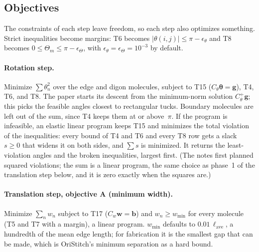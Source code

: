 \documentclass[11pt]{article}
\theoremstyle{definition}
\begin{document}
\subsection{Objectives}

The constraints of each step leave freedom, so each step also optimizes
something. Strict inequalities become margins: T6 becomes
$|\theta(i,j)| \le \pi - \epsilon_\theta$ and T8 becomes
$0 \le \Theta_m \le \pi - \epsilon_\Theta$, with
$\epsilon_\theta = \epsilon_\Theta = 10^{-3}$ by default.

\paragraph{Rotation step.} Minimize $\sum \theta_n^2$ over the edge and digon
molecules, subject to T15 ($C_\theta\boldsymbol\theta = \mathbf g$), T4, T6,
and T8. The paper starts its descent from the minimum-norm solution
$C_\theta^+\mathbf g$; this picks the feasible angles closest to rectangular
tucks. Boundary molecules are left out of the sum, since T4 keeps them at or
above~$\pi$. If the program is infeasible, an elastic linear program keeps
T15 and minimizes the total violation of the inequalities: every bound of T4
and T6 and every T8 row gets a slack $s \ge 0$ that widens it on both sides,
and $\sum s$ is minimized. It returns the least-violation angles and the
broken inequalities, largest first. (The notes first planned squared
violations; the sum is a linear program, the same choice as phase~1 of the
translation step below, and it is zero exactly when the squares are.)

\paragraph{Translation step, objective A (minimum width).} Minimize
$\sum_n w_n$ subject to T17 ($C_w\mathbf w = \mathbf b$) and
$w_n \ge w_{\min}$ for every molecule (T5 and T7 with a margin), a linear
program. $w_{\min}$ defaults to $0.01\,\ell_{\mathrm{ave}}$, a hundredth of the
mean edge length; for fabrication it is the smallest gap that can be made,
which is OriStitch's minimum separation as a hard bound.
\end{document}
